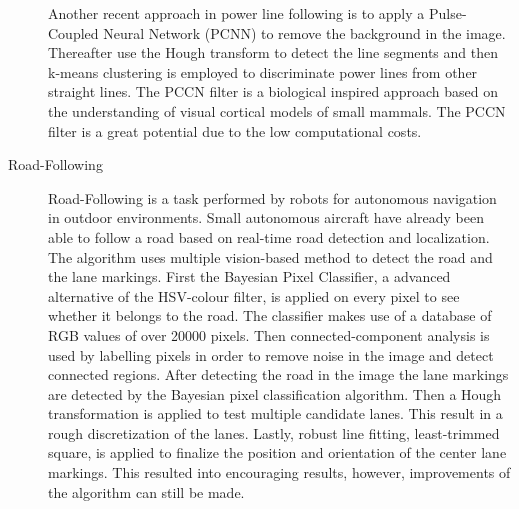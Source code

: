 \documentclass[a4paper]{article}
\begin{document}
\begin{description}
Another recent approach \cite{Zhengrong2008} in power line following is to apply a Pulse-Coupled Neural Network (PCNN) to remove the background in the image. Thereafter use the Hough transform to detect the line segments and then k-means clustering is employed to discriminate power lines from other straight lines. The PCCN filter is a biological inspired approach based on the understanding of visual cortical models of small mammals. The PCCN filter is a great potential due to the low computational costs.

\item[Road-Following] Road-Following is a task performed by robots for autonomous navigation in outdoor environments. Small autonomous aircraft \cite{Frew2004} have already been able to follow a road based on real-time road detection and localization. The algorithm uses multiple vision-based method to detect the road and the lane markings. First the Bayesian Pixel Classifier, a advanced alternative of the HSV-colour filter, is applied on every pixel to see whether it belongs to the road. The classifier makes use of a database of RGB values of over 20000 pixels. Then connected-component analysis is used by labelling pixels in order to remove noise in the image and detect connected regions. After detecting the road in the image the lane markings are detected by the Bayesian pixel classification algorithm. Then a Hough transformation is applied to test multiple candidate lanes. This result in a rough discretization of the lanes. Lastly, robust line fitting, least-trimmed square, is applied to finalize the position and orientation of the center lane markings. This resulted into encouraging results, however, improvements of the algorithm can still be made.


\end{description}
\end{document}
